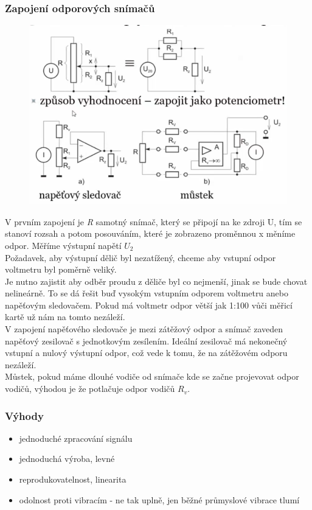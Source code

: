 \subsubsection{Zapojení odporových snímačů}
\begin{figure}[h!]
    \centering
    \includegraphics[scale = 0.4]{img/ZapojOdp.png}
\end{figure}
V prvním zapojení je \textit{R} samotný snímač, který se připojí na ke zdroji U, tím se stanoví rozsah a potom posouváním, které je zobrazeno proměnnou x měníme odpor. Měříme výstupní napětí \(U_2\)\\
Požadavek, aby výstupní dělič byl nezatížený, chceme aby vstupní odpor voltmetru byl poměrně veliký.\\
Je nutno zajistit aby odběr proudu z děliče byl co nejmenší, jinak se bude chovat nelineárně. To se dá řešit buď vysokým vstupním odporem voltmetru anebo napěťovým sledovačem. Pokud má voltmetr odpor větší jak 1:100 vůči měřicí kartě už nám na tomto nezáleží.\\
V zapojení napěťového sledovače je mezi zátěžový odpor a snímač zaveden napěťový zesilovač s jednotkovým zesílením. Ideální zesilovač má nekonečný vstupní a nulový výstupní odpor, což vede k tomu, že na zátěžovém odporu nezáleží.\\
Můstek, pokud máme dlouhé vodiče od snímače kde se začne projevovat odpor vodičů, výhodou je že potlačuje odpor vodičů \(R_v\).
\subsubsection{Výhody}
\begin{itemize}
    \item jednoduché zpracování signálu
    \item jednoduchá výroba, levné
    \item reprodukovatelnost, linearita
    \item odolnost proti vibracím - ne tak uplně, jen běžné průmyslové vibrace tlumí
\end{itemize}
